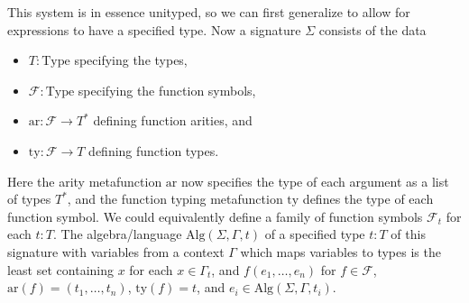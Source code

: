 \documentclass{article}
\theoremstyle{definition}
\begin{document}
This system is in essence unityped, so we can first generalize to allow for expressions to have a specified type. Now a signature $\Sigma$ consists of the data
\begin{itemize}
	\item $T : \text{Type}$ specifying the types,
	\item $\mathcal{F} : \text{Type}$ specifying the function symbols,
	\item $\text{ar} : \mathcal{F} \rightarrow T^*$ defining function arities, and
	\item $\text{ty} : \mathcal{F} \rightarrow T$ defining function types.
\end{itemize}
Here the arity metafunction $\text{ar}$ now specifies the type of each argument as a list of types $T^*$, and the function typing metafunction $\text{ty}$ defines the type of each function symbol. We could equivalently define a family of function symbols $\mathcal{F}_t$ for each $t : T$. The algebra/language $\text{Alg}(\Sigma,\Gamma,t)$ of a specified type $t : T$ of this signature with variables from a context $\Gamma$ which maps variables to types is the least set containing $x$ for each $x \in \Gamma_t$, and $f(e_1,\ldots,e_n)$ for $f \in \mathcal{F}$, $\text{ar}(f) = (t_1,\ldots,t_n)$, $\text{ty}(f) = t$, and $e_i \in \text{Alg}(\Sigma,\Gamma,t_i)$.\\
\end{document}
